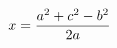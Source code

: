 \documentclass[preview]{standalone}
\begin{document}
\begin{align*}
\special{dvisvgm:raw <g id='unique000'>}x = \frac{a^2 + c^2 - b^2}{2a}\special{dvisvgm:raw </g>}
\end{align*}
\end{document}
